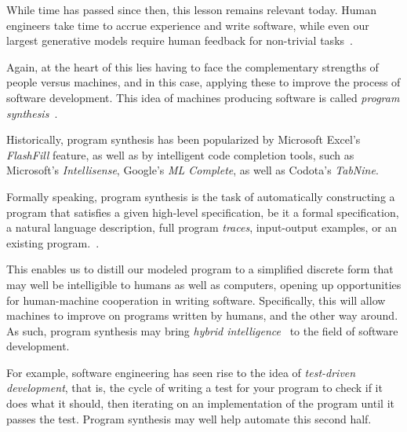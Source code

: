 \documentclass{article}
\begin{document}
While time has passed since then, this lesson remains relevant today.
Human engineers take time to accrue experience and write software,
while even our largest generative models require human feedback for non-trivial tasks~\citep{gpt3code}.

Again, at the heart of this lies having to face the complementary strengths of people versus machines,
and in this case, applying these to improve the process of software development.
This idea of machines producing software is called \emph{program synthesis}~\citep{church1957applications}.


Historically, program synthesis has been popularized by Microsoft Excel's \emph{FlashFill} feature,
as well as by intelligent code completion tools, such as Microsoft's \emph{Intellisense},
Google's \emph{ML Complete},
as well as Codota's \emph{TabNine}.

Formally speaking, program synthesis is the task of automatically constructing a program
that satisfies a given high-level specification,
be it a formal specification, a natural language description,
full program \emph{traces}, input-output examples,
or an existing program.~\citep{gulwani2017program}.


This enables us to distill our modeled program
to a simplified discrete form that may well be intelligible to humans as well as computers,
opening up opportunities for human-machine cooperation in writing software.
Specifically, this will allow machines to improve on programs written by humans, and the other way around.
As such, program synthesis may bring \emph{hybrid intelligence}~\citep{sun1994computational} to the field of software development.


For example, software engineering has seen rise to the idea of \emph{test-driven development},
that is, the cycle of writing a test for your program to check if it does what it should,
then iterating on an implementation of the program until it passes the test.
Program synthesis may well help automate this second half.
\end{document}
